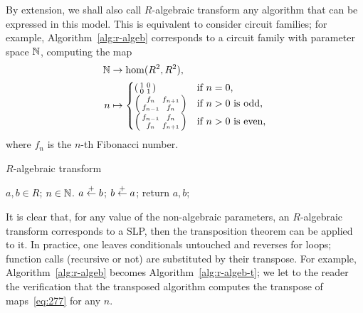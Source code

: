 {\ifafourps {}\fi
By extension, we shall also call $R$-algebraic transform any algorithm
that can be expressed in this model. This is equivalent to consider
circuit families; for example, Algorithm~\ref{alg:r-algeb} corresponds
to a circuit family with parameter space $\mathbb{N}$, computing the map
\begin{equation}
  \label{eq:277}
  \begin{aligned}
    \mathbb{N} &\rightarrow\hom(R^2,R^2)\text{,}\\
    n &\mapsto
    \begin{cases}
      \left(\begin{smallmatrix}1&0\\0&1\end{smallmatrix}\right) &\text{if $n=0$,}\\
      \left(\begin{smallmatrix}f_n&f_{n+1}\\f_{n-1}&f_n\end{smallmatrix}\right) &\text{if $n>0$ is odd,}\\
      \left(\begin{smallmatrix}f_{n-1}&f_n\\f_n&f_{n+1}\end{smallmatrix}\right) &\text{if $n>0$ is even,}
    \end{cases}
  \end{aligned}
\end{equation}
where $f_n$ is the $n$-th Fibonacci number.}

\begin{algorithm}
  \caption{\label{alg:r-algeb}$R$-algebraic transform}
  \begin{algorithmic}
    \REQUIRE $a,b\in R$; $n\in\mathbb{N}$.
    \STATE $a \overset{+}{\leftarrow} b$;
    \ELSE
    \STATE $b \overset{+}{\leftarrow} a$;
    \ENDIF
    \ENDFOR
    \STATE return $a,b$;
  \end{algorithmic}
\end{algorithm}


It is clear that, for any value of the non-algebraic parameters, an
$R$-algebraic transform corresponds to a SLP, then the transposition
theorem can be applied to it. In practice, one leaves conditionals
untouched and reverses for loops; function calls (recursive or not)
are substituted by their transpose. For example,
Algorithm~\ref{alg:r-algeb} becomes Algorithm~\ref{alg:r-algeb-t}; we
let to the reader the verification that the transposed algorithm
computes the transpose of maps~\eqref{eq:277} for any $n$.

